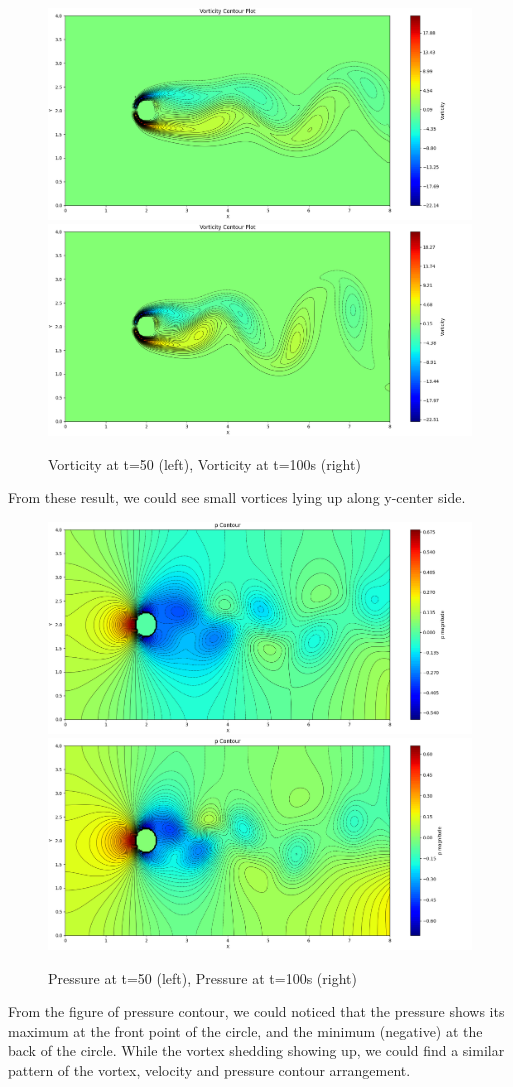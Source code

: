 \documentclass[12pt]{article}
\begin{document}
\begin{figure}[H]
    \centering
    \includegraphics[width=0.45\linewidth]{figure/N32_Re150_8x4_t50/vor_N32_Re150_8x4_t50.jpg}
    \includegraphics[width=0.45\linewidth]{figure/N32_Re150_8x4_t100/vor_N32_Re150_8x4_t100.jpg}
    \caption{Vorticity at t=50 (left), Vorticity at t=100s (right)}
\end{figure}

From these result, we could see small vortices lying up along y-center side.

\begin{figure}[H]
    \centering
    \includegraphics[width=0.45\linewidth]{figure/N32_Re150_8x4_t50/p_N32_Re150_8x4_t50.jpg}
    \includegraphics[width=0.45\linewidth]{figure/N32_Re150_8x4_t100/p_N32_Re150_8x4_t100.jpg}
    \caption{Pressure at t=50 (left), Pressure at t=100s (right)}
\end{figure}

From the figure of pressure contour, we could noticed that the pressure shows its maximum at the front point of the circle, and the minimum (negative) at the back of the circle. While the vortex shedding showing up, we could find a similar pattern of the vortex, velocity and pressure contour arrangement.
\end{document}
